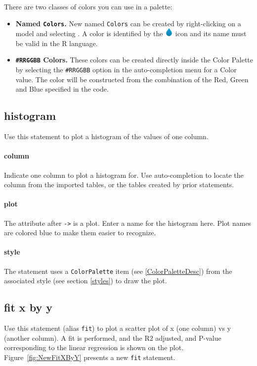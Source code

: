 There are two classes of colors you can use in a palette:
\begin{itemize}
\item \textbf{Named \texttt{Colors}.} New named \texttt{Colors} can be created by right-clicking on a model and selecting . A color is identified by the \includegraphics[height=2ex]{figures/color.png} icon and its name must be valid in the R language.
\item \textbf{\texttt{\#RRGGBB} Colors.} These colors can be created directly inside the Color Palette by selecting the \texttt{\#RRGGBB} option in the auto-completion menu for a Color value. The color will be constructed from the combination of the Red, Green and Blue specified in the code.
\end{itemize} 

\subsection{histogram}
Use this statement to plot a histogram of the values of one column.
\paragraph{column}
Indicate one column to plot a histogram for. Use auto-completion to locate the column from the imported tables, or the tables created by prior statements. 

\paragraph{plot}
The attribute after \texttt{->} is a plot. Enter a name for the histogram here. Plot names are colored blue to make them easier to recognize.

\paragraph{style}
The statement uses a \texttt{Color\allowbreak{}Palette} item (see \ref{ColorPaletteDesc}) from the associated style (see section \ref{styles}) to draw the plot. 

\subsection{fit x by y}
Use this statement (alias \texttt{fit}) to plot a scatter plot of x (one column) vs y (another column). A fit is performed, and the R2 adjusted, and P-value corresponding to the linear regression is shown on the plot. Figure~\ref{fig:NewFitXByY} presents a new \texttt{fit} statement.

